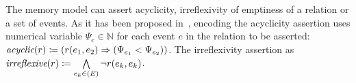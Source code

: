 The memory model can assert acyclicity, irreflexivity of emptiness of a relation or a set of events.
As it has been proposed in~\cite{Porthos17a}, encoding the acyclicity assertion uses numerical variable $\Psi_e \in \mathbb{N}$ for each event $e$ in the relation to be asserted: $\textit{acyclic}(r) \coloneqq (r(e_1,e_2) \Rightarrow (\Psi_{e_1} < \Psi_{e_2}))$.
The irreflexivity assertion as $\textit{irreflexive}(r) \coloneqq \bigwedge\limits_{e_k \in \mathbb(E)}^{} \lnot r(e_k,e_k)$.




%

